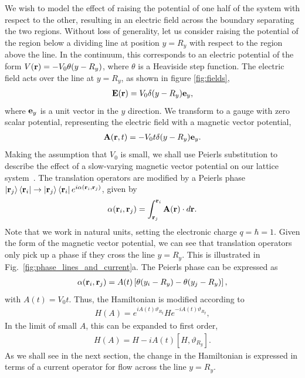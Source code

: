 We wish to model the effect of raising the potential of one half of the system with respect to the other, resulting in an electric field across the boundary separating the two regions. Without loss of generality, let us consider raising the potential of the region below a dividing line at position $y = R_y$ with respect to the region above the line. In the continuum, this corresponds to an electric potential of the form $V(\textbf r) = -V_0 \theta(y - R_y) $, where $\theta$ is a Heaviside step function. The electric field acts over the line at $y = R_y$, as shown in figure \ref{fig:fields},
\begin{align}
    \textbf E(\textbf r)= V_0 \delta(y -R_y) \textbf e_y,
\end{align}
where $\textbf e_y$ is a unit vector in the $y$ direction. We transform to a gauge with zero scalar potential, representing the electric field with a magnetic vector potential,
\begin{align}
    \textbf A(\textbf r, t) = -V_0 t \delta(y - R_y) \textbf e_y.
\end{align}
Making the assumption that $V_0$ is small, we shall use Peierls substitution to describe the effect of a slow-varying magnetic vector potential on our lattice system~\cite{peierls_zur_1933}. The translation operators are modified by a Peierls phase $\ket{\textbf r_j}\bra{\textbf r_i} \rightarrow \ket{\textbf r_j}\bra{\textbf r_i} e^{i\alpha(\textbf r_i, \textbf r_j)}$, given by 
\begin{align}
    \alpha(\textbf r_i, \textbf r_j) = \int_{\textbf r_j}^{\textbf r_i} \textbf A(\textbf r) \cdot d\textbf r.
\end{align}
Note that we work in natural units, setting the electronic charge $q = \hbar = 1$. Given the form of the magnetic vector potential, we can see that translation operators only pick up a phase if they cross the line $y = R_y$. This is illustrated in Fig.~\ref{fig:phase_lines_and_current}a. The Peierls phase can be expressed as
\begin{align}\label{eqn:phase}
    \alpha(\textbf r_i, \textbf r_j) = A(t) \left [ \theta( y_{i} - R_y) - \theta( y_{j} - R_y) \right ],
\end{align}
with $A(t) = V_0 t$. Thus, the Hamiltonian is modified according to
\begin{align}\label{eqn:H_shift}
    H(A) = e^{i A(t) \vartheta_{R_y}} H e^{-i A(t) \vartheta_{R_y}},
\end{align}
In the limit of small $A$, this can be expanded to first order,
\begin{align}\label{eqn:H_A_first_order}
    H(A) = H - i A(t) \left [ H, \vartheta_{R_y} \right ].
\end{align}
As we shall see in the next section, the change in the Hamiltonian is expressed in terms of a current operator for flow across the line $y = R_y$.

